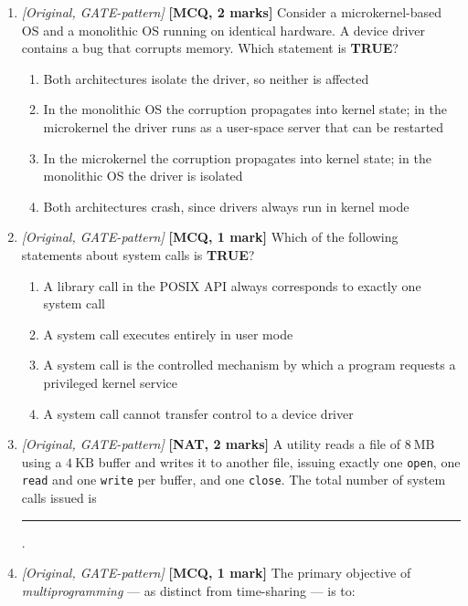 \documentclass[11pt]{article}
\begin{document}
\begin{enumerate}
\item[\textbf{Q4}] \textit{[Original, GATE-pattern]} \textbf{[MCQ, 2 marks]} Consider a microkernel-based OS and a monolithic OS running on identical hardware. A device driver contains a bug that corrupts memory. Which statement is \textbf{TRUE}?

\begin{enumerate}
  \item[(A)] Both architectures isolate the driver, so neither is affected
  \item[(B)] In the monolithic OS the corruption propagates into kernel state; in the microkernel the driver runs as a user-space server that can be restarted
  \item[(C)] In the microkernel the corruption propagates into kernel state; in the monolithic OS the driver is isolated
  \item[(D)] Both architectures crash, since drivers always run in kernel mode
\end{enumerate}

\item[\textbf{Q5}] \textit{[Original, GATE-pattern]} \textbf{[MCQ, 1 mark]} Which of the following statements about system calls is \textbf{TRUE}?

\begin{enumerate}
  \item[(A)] A library call in the POSIX API always corresponds to exactly one system call
  \item[(B)] A system call executes entirely in user mode
  \item[(C)] A system call is the controlled mechanism by which a program requests a privileged kernel service
  \item[(D)] A system call cannot transfer control to a device driver
\end{enumerate}

\item[\textbf{Q6}] \textit{[Original, GATE-pattern]} \textbf{[NAT, 2 marks]} A utility reads a file of $8\ \text{MB}$ using a $4\ \text{KB}$ buffer and writes it to another file, issuing exactly one \texttt{open}, one \texttt{read} and one \texttt{write} per buffer, and one \texttt{close}. The total number of system calls issued is \rule{1.5cm}{0.4pt}.

\item[\textbf{Q7}] \textit{[Original, GATE-pattern]} \textbf{[MCQ, 1 mark]} The primary objective of \emph{multiprogramming} — as distinct from time-sharing — is to:


\end{enumerate}
\end{document}
